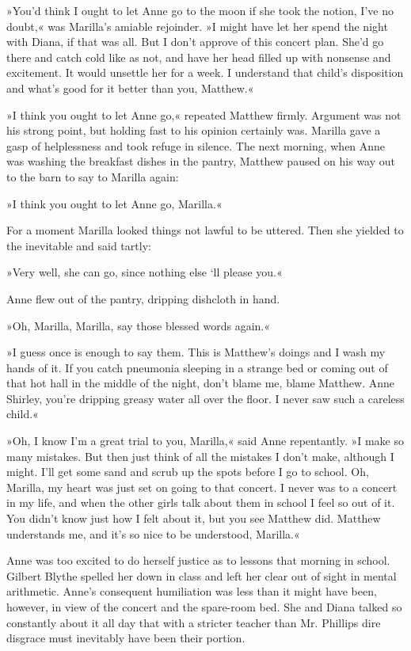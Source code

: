 »You’d think I ought to let Anne go to the moon if she took the notion, I’ve no doubt,« was Marilla’s amiable rejoinder. »I might have let her spend the night with Diana, if that was all. But I don’t approve of this concert plan. She’d go there and catch cold like as not, and have her head filled up with nonsense and excitement. It would unsettle her for a week. I understand that child’s disposition and what’s good for it better than you, Matthew.«

»I think you ought to let Anne go,« repeated Matthew firmly. Argument was not his strong point, but holding fast to his opinion certainly was. Marilla gave a gasp of helplessness and took refuge in silence. The next morning, when Anne was washing the breakfast dishes in the pantry, Matthew paused on his way out to the barn to say to Marilla again:

»I think you ought to let Anne go, Marilla.«

For a moment Marilla looked things not lawful to be uttered. Then she yielded to the inevitable and said tartly:

»Very well, she can go, since nothing else ‘ll please you.«

Anne flew out of the pantry, dripping dishcloth in hand.

»Oh, Marilla, Marilla, say those blessed words again.«

»I guess once is enough to say them. This is Matthew’s doings and I wash my hands of it. If you catch pneumonia sleeping in a strange bed or coming out of that hot hall in the middle of the night, don’t blame me, blame Matthew. Anne Shirley, you’re dripping greasy water all over the floor. I never saw such a careless child.«

»Oh, I know I’m a great trial to you, Marilla,« said Anne repentantly. »I make so many mistakes. But then just think of all the mistakes I don’t make, although I might. I’ll get some sand and scrub up the spots before I go to school. Oh, Marilla, my heart was just set on going to that concert. I never was to a concert in my life, and when the other girls talk about them in school I feel so out of it. You didn’t know just how I felt about it, but you see Matthew did. Matthew understands me, and it’s so nice to be understood, Marilla.«

Anne was too excited to do herself justice as to lessons that morning in school. Gilbert Blythe spelled her down in class and left her clear out of sight in mental arithmetic. Anne’s consequent humiliation was less than it might have been, however, in view of the concert and the spare-room bed. She and Diana talked so constantly about it all day that with a stricter teacher than Mr. Phillips dire disgrace must inevitably have been their portion.

